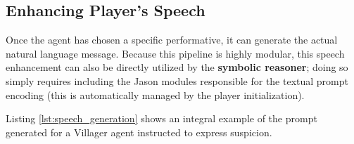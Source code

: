 \subsection{Enhancing Player's Speech}
\label{subsec:llm-speech}

Once the agent has chosen a specific performative, it can generate the actual natural language message. Because this pipeline is highly modular, this speech enhancement can also be directly utilized by the \textbf{symbolic reasoner}; doing so simply requires including the Jason modules responsible for the textual prompt encoding (this is automatically managed by the player initialization).

Listing \ref{lst:speech_generation} shows an integral example of the prompt generated for a Villager agent instructed to express suspicion. 

